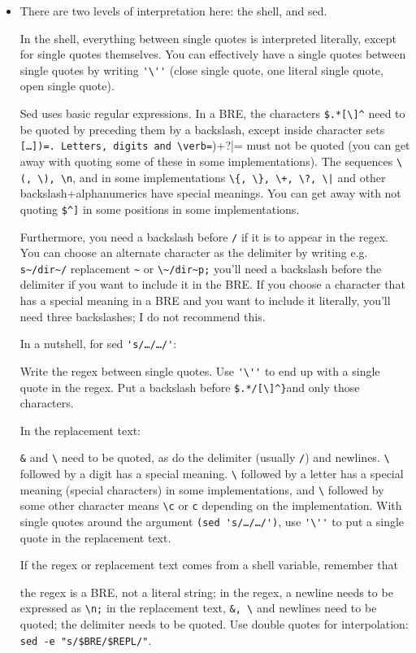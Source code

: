 \begin{itemize}

\item There are two levels of interpretation here: the shell, and sed.

In the shell, everything between single quotes is interpreted literally, except for single quotes themselves. You can effectively have a single quotes between single quotes by writing \lstinline[columns=fixed]{'\''} (close single quote, one literal single quote, open single quote).

Sed uses basic regular expressions. In a BRE, the characters \verb=$.*[\]^= need to be quoted by preceding them by a backslash, except inside character sets \verb([…])=. Letters, digits and \verb=(){}+?|= must not be quoted (you can get away with quoting some of these in some implementations). The sequences \verb=\(, \), \n=, and in some implementations \verb=\{, \}, \+, \?, \|= and other backslash+alphanumerics have special meanings. You can get away with not quoting \verb=$^]= in some positions in some implementations.

Furthermore, you need a backslash before \verb=/= if it is to appear in the regex. You can choose an alternate character as the delimiter by writing e.g. \verb=s~/dir~/= replacement \verb=~= or \verb=\~/dir~p;= you'll need a backslash before the delimiter if you want to include it in the BRE. If you choose a character that has a special meaning in a BRE and you want to include it literally, you'll need three backslashes; I do not recommend this.

In a nutshell, for sed \verb='s/…/…/'=:

    Write the regex between single quotes.
    Use \verb='\''= to end up with a single quote in the regex.
    Put a backslash before \verb=$.*/[\]^}=and only those characters.

In the replacement text:

  \lstinline[columns=fixed]{&} and \lstinline[columns=fixed]{\} need to be quoted, as do the delimiter (usually \lstinline[columns=fixed]{/}) and newlines.
    \lstinline[columns=fixed]{\} followed by a digit has a special meaning. \lstinline[columns=fixed]{\} followed by a letter has a special meaning (special characters) in some implementations, and \lstinline[columns=fixed]{\} followed by some other character means \lstinline[columns=fixed]{\c} or \lstinline[columns=fixed]{c} depending on the implementation.
    With single quotes around the argument \verb=(sed 's/…/…/')=, use \verb='\''= to put a single quote in the replacement text.

If the regex or replacement text comes from a shell variable, remember that

    the regex is a BRE, not a literal string;
    in the regex, a newline needs to be expressed as \verb=\n;=
    in the replacement text, \verb=&, \= and newlines need to be quoted;
    the delimiter needs to be quoted.
    Use double quotes for interpolation: \verb=sed -e "s/$BRE/$REPL/"=.


\end{itemize}

